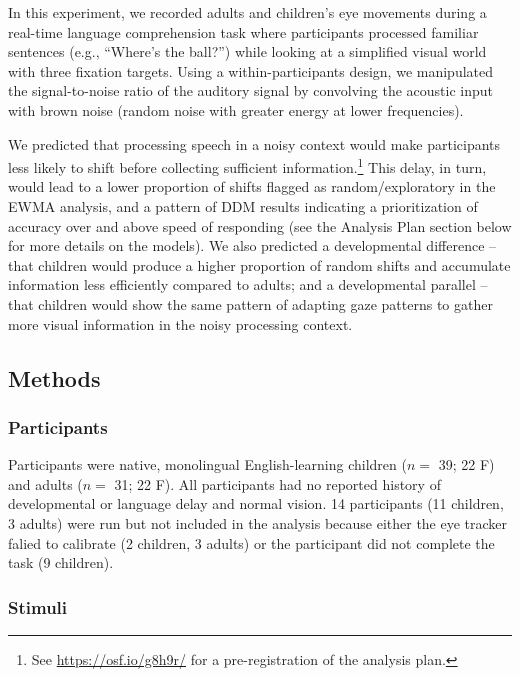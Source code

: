 \documentclass[english,floatsintext,man]{apa6}
\begin{document}
In this experiment, we recorded adults and children's eye movements
during a real-time language comprehension task where participants
processed familiar sentences (e.g., \enquote{Where's the ball?}) while
looking at a simplified visual world with three fixation targets. Using
a within-participants design, we manipulated the signal-to-noise ratio
of the auditory signal by convolving the acoustic input with brown noise
(random noise with greater energy at lower frequencies).

We predicted that processing speech in a noisy context would make
participants less likely to shift before collecting sufficient
information.\footnote{See \url{https://osf.io/g8h9r/} for a
  pre-registration of the analysis plan.} This delay, in turn, would
lead to a lower proportion of shifts flagged as random/exploratory in
the EWMA analysis, and a pattern of DDM results indicating a
prioritization of accuracy over and above speed of responding (see the
Analysis Plan section below for more details on the models). We also
predicted a developmental difference -- that children would produce a
higher proportion of random shifts and accumulate information less
efficiently compared to adults; and a developmental parallel -- that
children would show the same pattern of adapting gaze patterns to gather
more visual information in the noisy processing context.

\hypertarget{methods-2}{%
\subsection{Methods}\label{methods-2}}

\hypertarget{participants-2}{%
\subsubsection{Participants}\label{participants-2}}

Participants were native, monolingual English-learning children (\(n=\)
39; 22 F) and adults (\(n=\) 31; 22 F). All participants had no reported
history of developmental or language delay and normal vision. 14
participants (11 children, 3 adults) were run but not included in the
analysis because either the eye tracker falied to calibrate (2 children,
3 adults) or the participant did not complete the task (9 children).

\hypertarget{stimuli-2}{%
\subsubsection{Stimuli}\label{stimuli-2}}
\end{document}
